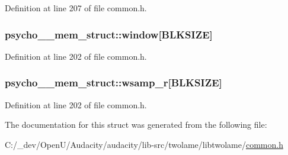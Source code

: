 Definition at line 207 of file common.\+h.

\subsubsection[{\texorpdfstring{window}{window}}]{ psycho\+\_\+\_\+mem\+\_\+struct\+::window\mbox{[}{\bf B\+L\+K\+S\+I\+ZE}\mbox{]}}\hypertarget{structpsycho__4__mem__struct_a206261544c47929c8ee055934b491d2d}{}\label{structpsycho__4__mem__struct_a206261544c47929c8ee055934b491d2d}


Definition at line 202 of file common.\+h.

\subsubsection[{\texorpdfstring{wsamp\+\_\+r}{wsamp_r}}]{ psycho\+\_\+\_\+mem\+\_\+struct\+::wsamp\+\_\+r\mbox{[}{\bf B\+L\+K\+S\+I\+ZE}\mbox{]}}\hypertarget{structpsycho__4__mem__struct_a10f952a4a983e440da46bce00197df8c}{}\label{structpsycho__4__mem__struct_a10f952a4a983e440da46bce00197df8c}


Definition at line 202 of file common.\+h.



The documentation for this struct was generated from the following file\+:\begin{DoxyCompactItemize}
\item 
C\+:/\+\_\+dev/\+Open\+U/\+Audacity/audacity/lib-\/src/twolame/libtwolame/\hyperlink{twolame_2libtwolame_2common_8h}{common.\+h}\end{DoxyCompactItemize}
